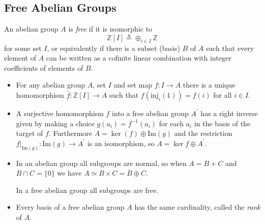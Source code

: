 \documentclass{article}
\begin{document}
\subsection{Free Abelian Groups}
An abelian group $A$ is \emph{free} if it is isomorphic to
$$
\mathbb{Z}[I] \triangleq \oplus_{i \in I} \mathbb{Z}
$$
for some set $I$, or equivalently if there is a subset (basis) $B$
of $A$ such that every element of $A$ can be written as a cofinite
linear combination with integer coefficients of elements of $B$.

\begin{itemize}
  \item{
    For any abelian group $A$, set $I$ and set map $f : I \to A$
    there is a unique homomorphism $\bar{f} : \mathbb{Z}[I] \to A$ such that
    $f(\mathrm{inj}_i(1)) = f(i)$ for all $i \in I$.
  }
  \item{
    A surjective homomorphism $f$ into a free abelian group $A^\prime$ has a right inverse
    given by making a choice $g(a_i) = f^{-1}(a_i)$ for each $a_i$ in the basis of
    the target of $f$. Furthermore $A = \ker(f) \oplus \mathrm{Im}(g)$ and the
    restriction $f|_{\mathrm{Im}(g)} : \mathrm{Im}(g) \to A^\prime$ is an isomorphism, so
    $A = \ker{f} \oplus A^\prime$.
  }
  \item{
    In an abelian group all subgroups are normal, so when $A = B + C$ and
    $B \cap C = \{0\}$ we have $A \simeq B \times C = B \oplus C$.

    In a free abelian group all subgroups are free.
  }
  \item{
    Every basis of a free abelian group $A$ has the same cardinality,
    called the \emph{rank} of $A$.
  }
\end{itemize}
\end{document}
